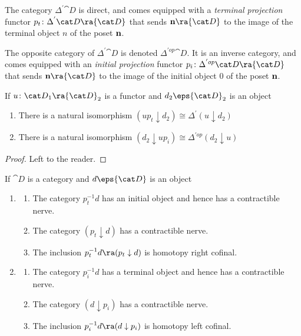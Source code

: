 The category $\Delta^{'}{\cat D}$ is direct, and comes equipped with a {\it terminal projection} functor $p_t \colon \Delta^{'}{\cat D} \ra {\cat D}$ that sends ${\bf n} \ra {\cat D}$ to the image of the terminal object $n$ of the poset ${\bf n}$.

The opposite category of $\Delta^{'}{\cat D}$ is denoted $\Delta^{'op}{\cat D}$. It is an inverse category, and comes equipped with an {\it initial projection} functor $p_i \colon \Delta^{'op}{\cat D} \ra {\cat D}$ that sends ${\bf n} \ra {\cat D}$ to the image of the initial object $0$ of the poset ${\bf n}$.

\begin{lem}
\label{lem:deltaprimeovercat}
If $u \colon {\cat D}_1 \ra {\cat D}_2$ is a functor and $d_2 \eps {\cat D}_2$ is an object
\begin{enumerate}
\item
There is a natural isomorphism $(up_t \downarrow d_2) \cong \Delta^{'}(u \downarrow d_2)$
\item
There is a natural isomorphism $(d_2 \downarrow up_i) \cong \Delta^{'op}(d_2 \downarrow u)$
\end{enumerate}
\end{lem}

\begin{proof}
Left to the reader.
\end{proof}

\begin{lem}
\label{lem:deltaprimelcofinal}
If ${\cat D}$ is a category and $d \eps {\cat D}$ is an object
\begin{enumerate}
\item
\begin{enumerate}
\item
The category $p_t^{-1}d$ has an initial object and hence has a contractible nerve.
\item
The category $(p_t \downarrow d)$ has a contractible nerve.
\item
The inclusion $p_t^{-1}d \ra (p_t \downarrow d)$ is homotopy right cofinal.
\end{enumerate}
\item
\begin{enumerate}
\item
The category $p_i^{-1}d$ has a terminal object and hence has a contractible nerve.
\item
The category $(d \downarrow p_i)$ has a contractible nerve.
\item
The inclusion $p_i^{-1}d \ra (d \downarrow p_i)$ is homotopy left cofinal.
\end{enumerate}
\end{enumerate}
\end{lem}


